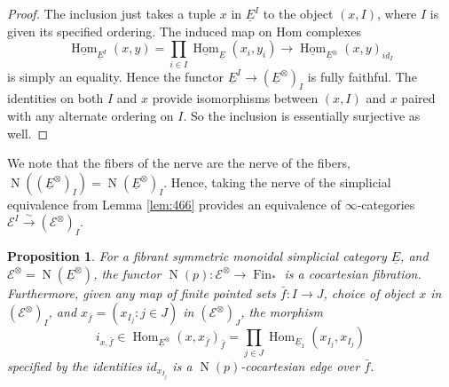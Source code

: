 \documentclass[reqno]{amsart}
\newtheorem{proposition}[lemma]{Proposition}
\theoremstyle{definition}
\newcommand{\msc}[1]{\mathscr{#1}}
\newcommand{\opn}[1]{\operatorname{#1}}
\newcommand{\ot}{\otimes}
\newcommand{\uHom}{\underline{\operatorname{Hom}}}
\DeclareMathOperator{\Hom}{Hom}
\DeclareMathOperator{\Fin}{Fin}
\renewcommand{\1}{\mathbf{1}}
\begin{document}
\begin{proof}
The inclusion just takes a tuple $x$ in $\underline{E}^I$ to the object $(x,I)$, where $I$ is given its specified ordering.  The induced map on Hom complexes
\[
\uHom_{\underline{E}^{I}}(x,y)=\prod_{i\in I}\uHom_{\underline{E}}(x_i,y_i)\to \uHom_{\underline{E}^{\ot}}(x,y)_{id_I} 
\]
is simply an equality.  Hence the functor $\underline{E}^I\to (\underline{E}^{\ot})_I$ is fully faithful.  The identities on both $I$ and $x$ provide isomorphisms between $(x,I)$ and $x$ paired with any alternate ordering on $I$.  So the inclusion is essentially surjective as well.
\end{proof}

We note that the fibers of the nerve are the nerve of the fibers, $\opn{N}((\underline{E}^{\ot})_I)=\opn{N}(\underline{E}^{\ot})_I$.  Hence, taking the nerve of the simplicial equivalence from Lemma \ref{lem:466} provides an equivalence of $\infty$-categories $\msc{E}^I\overset{\sim}\to (\msc{E}^{\ot})_I$.

\begin{proposition}\label{prop:symm_infty}
For a fibrant symmetric monoidal simplicial category $\underline{E}$, and $\msc{E}^{\ot}=\opn{N}(\underline{E}^{\ot})$, the functor $\opn{N}(p):\msc{E}^{\ot}\to \Fin_\ast$ is a cocartesian fibration.  Furthermore, given any map of finite pointed sets $\bar{f}:I\to J$, choice of object $x$ in $(\msc{E}^{\ot})_I$, and $x_{\bar{f}}=(x_{I_j}:j\in J)$ in $(\msc{E}^{\ot})_J$, the morphism
\[
i_{x,\bar{f}}\in \Hom_{\underline{E}^{\ot}}(x,x_{\bar{f}})_{\bar{f}}=\prod_{j\in J}\Hom_{\underline{E}_1}(x_{I_j},x_{I_j})
\]
specified by the identities $id_{x_{I_j}}$ is a $\opn{N}(p)$-cocartesian edge over $\bar{f}$.
\end{proposition}
\end{document}
